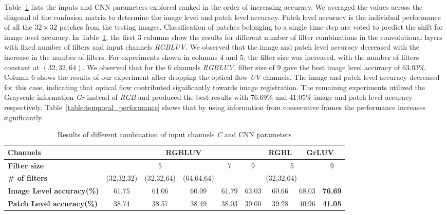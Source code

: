 \documentclass{article}
\begin{document}
Table~\ref{table:cnn_param} lists the inputs and CNN parameters explored ranked in the order of increasing accuracy. We averaged the values across the diagonal of the confusion matrix to determine the image level and patch level accuracy. Patch level accuracy is the individual performance of all the $32\times32$ patches from the testing images. Classification of patches belonging to a single time-step are voted to predict the shift for image level accuracy. In Table~\ref{table:cnn_param}, the first 3 columns show the results for different number of filter combinations in the convolutional layers with fixed number of filters and input channels \emph{RGBLUV}. We observed that the image  and patch level accuracy decreased with the increase in the number of filters. For experiments shown in columns 4 and 5, the filter size was increased, with the number of filters constant at $(32,32,64)$. We observed that for the 6 channels \emph{RGBLUV}, filter size of 9 gave the best image level accuracy of $63.03\%$. Column 6 shows the results of our experiment after dropping the optical flow \emph{UV} channels. The image and patch level accuracy decreased for this case, indicating that optical flow contributed significantly towards image registration. The remaining experiments utilized the Grayscale information \emph{Gr} instead of \emph{RGB} and produced the best results with $76.69\%$ and $41.05\%$ image and patch level accuracy respectively. Table~\ref{table:temporal_performance} shows that by using information from consecutive frames the performance increases significantly.

\begin{table}[ht]
\small
\caption{Results of different combination of input channels \emph{C} and CNN parameters}

\begin{center}
\begin{tabular}{|p{2cm}|c|c|c|c|c|c|c|c|} \hline
    \textbf{Channels} & \multicolumn{5}{|c|}{RGBLUV} & RGBL & \multicolumn{2}{|c|}{GrLUV} \\
    \hline
    \textbf{Filter size} &\multicolumn{3}{|c|}{5} & 7 & 9 & \multicolumn{2}{|c|}{5} & 9 \\
    \hline
    \textbf{\# of filters} & (32,32,32) & (32,32,64) & (64,64,64) & \multicolumn{5}{|c|}{(32,32,64)}  \\
    \hline
    \textbf{Image Level accuracy(\%)} & 61.75 & 61.06 & 60.09 & 61.79 & 63.03 & 60.66 & 68.03 & \textbf{76.69} \\
    \hline
    \textbf{Patch Level accuracy(\%)} & 38.74 & 38.57 & 38.49 & 38.03 & 39.00 & 39.28 & 40.96 & \textbf{41.05} \\
    \hline
\end{tabular}
\label{table:cnn_param}
\end{center}
\end{table}
\end{document}

